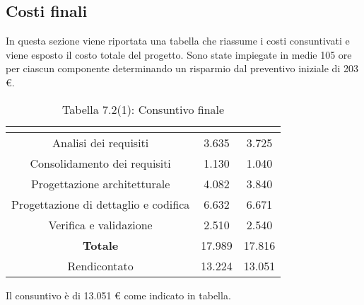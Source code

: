 \subsection{Costi finali}
In questa sezione viene riportata una tabella che riassume i costi consuntivati e viene esposto il costo totale del progetto.
Sono state impiegate in medie 105 ore per ciascun componente determinando un risparmio dal preventivo iniziale di 203 \euro.
\renewcommand{\arraystretch}{1.5}
\begin{table}[H]
\begin{center}
\begin{tabular}{|c|c|c|}
\hline
\rowcolor{title_row}
\textbf{\color{title_text}{Periodo}}  & \textbf{\color{title_text}{Preventivo \euro}} & \textbf{\color{title_text}{Consuntivo \euro}} \\ \hline
Analisi dei requisiti   & 3.635 & 3.725 \\ \hline
Consolidamento dei requisiti   & 1.130 & 1.040 \\ \hline
Progettazione architetturale    & 4.082 & 3.840 \\ \hline
Progettazione di dettaglio e codifica    & 6.632 & 6.671 \\ \hline
Verifica e validazione    & 2.510 & 2.540 \\ \hline
\textbf{Totale}   & 17.989 & 17.816 \\ \hline
Rendicontato   & 13.224 & 13.051 \\ \hline
\end{tabular}
\caption{Tabella 7.2(1): Consuntivo finale\label{}}
\end{center}
\end{table}
\renewcommand{\arraystretch}{1}

Il consuntivo è di 13.051 \euro{} come indicato in tabella.
\newpage
